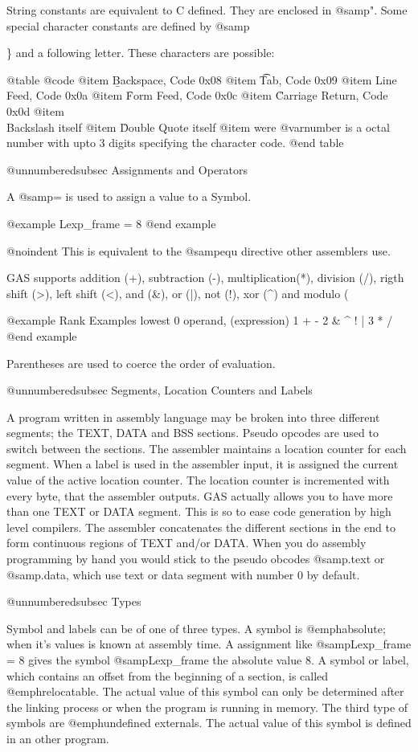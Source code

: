 {{{{String constants are equivalent to C defined. They are enclosed 
in @samp{"}. Some special character constants are defined by @samp{\}
and a following letter. These characters are possible:

@table @code
@item \b
Backspace, Code 0x08
@item \t
Tab, Code 0x09
@item \n
Line Feed, Code 0x0a
@item \f
Form Feed, Code 0x0c
@item \r
Carriage Return, Code 0x0d
@item \\
Backslash itself
@item \"
Double Quote itself
@item 
were @var{number} is a octal number with upto 3 digits specifying the
character code.
@end table

@unnumberedsubsec Assignments and Operators

A @samp{=} is used to assign a value to a Symbol.

@example
Lexp_frame = 8
@end example

@noindent
This is equivalent to the @samp{equ} directive other assemblers use.

GAS supports addition (+), subtraction (-), multiplication(*), division
(/), rigth shift (>), left shift (<), and (&), or (|), not (!), xor (^)
and modulo (%

@example
        Rank    Examples
lowest   0       operand, (expression)
         1       + -
         2       & ^ ! |
         3       * / %
@end example

Parentheses are used to coerce the order of evaluation.

@unnumberedsubsec Segments, Location Counters and Labels

A program written in assembly language may be broken into three
different segments; the TEXT, DATA and BSS sections. Pseudo opcodes are
used to switch between the sections. The assembler maintains a location
counter for each segment. When a label is used in the assembler input,
it is assigned the current value of the active location counter. The
location counter is incremented with every byte, that the assembler 
outputs. GAS actually allows you to have more than one TEXT or DATA 
segment. This is so to ease code generation by high level compilers.
The assembler concatenates the different sections in the end to form 
continuous regions of TEXT and/or DATA. When you do assembly programming 
by hand you would stick to the pseudo obcodes @samp{.text} or
@samp{.data}, which use text or data segment with number 0 by default.

@unnumberedsubsec Types

Symbol and labels can be of one of three types. A symbol is @emph{absolute};
when it's values is known at assembly time. A assignment like 
@samp{Lexp_frame = 8} gives the symbol @samp{Lexp_frame} the absolute
value 8. A symbol or label, which contains an offset from the beginning
of a section, is called @emph{relocatable}. The actual value of this symbol
can only be determined after the linking process or when the program is 
running in memory. The third type of symbols are @emph{undefined externals}.
The actual value of this symbol is defined in an other program.

}}}}}
